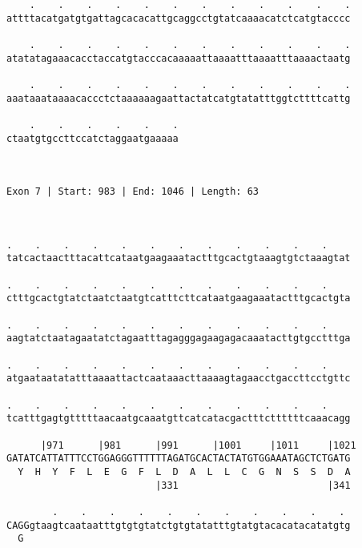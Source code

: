 \documentclass{article}
\begin{document}
\begin{Verbatim}
    .    .    .    .    .    .    .    .    .    .    .    .
attttacatgatgtgattagcacacattgcaggcctgtatcaaaacatctcatgtacccc
                                                            
    .    .    .    .    .    .    .    .    .    .    .    .
atatatagaaacacctaccatgtacccacaaaaattaaaatttaaaatttaaaactaatg
                                                            
    .    .    .    .    .    .    .    .    .    .    .    .
aaataaataaaacaccctctaaaaaagaattactatcatgtatatttggtcttttcattg
                                                            
    .    .    .    .    .    .
ctaatgtgccttccatctaggaatgaaaaa
                              
                              
 
Exon 7 | Start: 983 | End: 1046 | Length: 63



.    .    .    .    .    .    .    .    .    .    .    .    
tatcactaactttacattcataatgaagaaatactttgcactgtaaagtgtctaaagtat
                                                            
.    .    .    .    .    .    .    .    .    .    .    .    
ctttgcactgtatctaatctaatgtcatttcttcataatgaagaaatactttgcactgta
                                                            
.    .    .    .    .    .    .    .    .    .    .    .    
aagtatctaatagaatatctagaatttagagggagaagagacaaatacttgtgcctttga
                                                            
.    .    .    .    .    .    .    .    .    .    .    .    
atgaataatatatttaaaattactcaataaacttaaaagtagaacctgaccttcctgttc
                                                            
.    .    .    .    .    .    .    .    .    .    .    .    
tcatttgagtgtttttaacaatgcaaatgttcatcatacgactttcttttttcaaacagg
                                                            
      |971      |981      |991      |1001     |1011     |1021
GATATCATTATTTCCTGGAGGGTTTTTTAGATGCACTACTATGTGGAAATAGCTCTGATG
  Y  H  Y  F  L  E  G  F  L  D  A  L  L  C  G  N  S  S  D  A
                          |331                          |341
  
        .    .    .    .    .    .    .    .    .    .    . 
CAGGgtaagtcaataatttgtgtgtatctgtgtatatttgtatgtacacatacatatgtg
  G                                                         
                                                            

\end{Verbatim}
\end{document}
